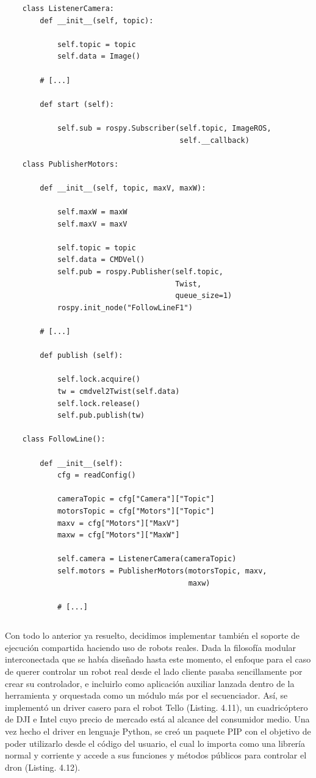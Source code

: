 \begin{verbatim}
    class ListenerCamera:
        def __init__(self, topic):
            
            self.topic = topic
            self.data = Image()
    
        # [...]
    
        def start (self):
     
            self.sub = rospy.Subscriber(self.topic, ImageROS,
                                        self.__callback)
    
    class PublisherMotors:
     
        def __init__(self, topic, maxV, maxW):
    
            self.maxW = maxW
            self.maxV = maxV
    
            self.topic = topic
            self.data = CMDVel()
            self.pub = rospy.Publisher(self.topic,
                                       Twist,
                                       queue_size=1)
            rospy.init_node("FollowLineF1")
    
        # [...]
    
        def publish (self):
    
            self.lock.acquire()
            tw = cmdvel2Twist(self.data)
            self.lock.release()
            self.pub.publish(tw)
    
    class FollowLine():
        
        def __init__(self):
            cfg = readConfig()
    
            cameraTopic = cfg["Camera"]["Topic"]
            motorsTopic = cfg["Motors"]["Topic"]
            maxv = cfg["Motors"]["MaxV"]
            maxw = cfg["Motors"]["MaxW"]
    
            self.camera = ListenerCamera(cameraTopic)
            self.motors = PublisherMotors(motorsTopic, maxv,
                                          maxw)
    
            # [...]
\end{verbatim}
\begin{lstlisting}[caption=Creación de la Red Interna de Comunicación]
\end{lstlisting}

Con todo lo anterior ya resuelto, decidimos implementar también el soporte de ejecución compartida haciendo uso de robots reales. Dada la filosofía modular interconectada que se había diseñado hasta este momento, el enfoque para el caso de querer controlar un robot real desde el lado cliente pasaba sencillamente por crear su controlador, e incluirlo como aplicación auxiliar lanzada dentro de la herramienta y orquestada como un módulo más por el secuenciador. Así, se implementó un driver casero para el robot Tello (Listing. 4.11), un cuadricóptero de DJI e Intel cuyo precio de mercado está al alcance del consumidor medio. Una vez hecho el driver en lenguaje Python, se creó un paquete PIP con el objetivo de poder utilizarlo desde el código del usuario, el cual lo importa como una librería normal y corriente y accede a sus funciones y métodos públicos para controlar el dron (Listing. 4.12). 

